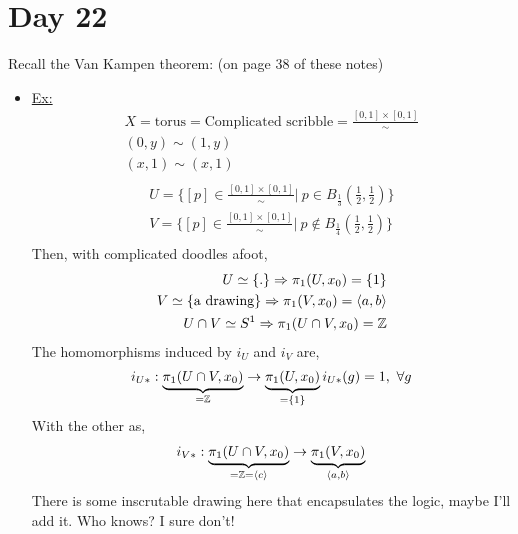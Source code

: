 \documentclass[../notes.tex]{subfiles}
\begin{document}
\section{Day 22}
Recall the Van Kampen theorem: (on page 38 of these notes)
\begin{itemize}
    \item \underline{Ex:}
        \begin{align*}
            X = \text{torus} = \text{Complicated scribble} =
            \frac{[0,1]\times [0,1]}{\sim}\\
            (0,y)\sim(1,y)\\
            (x,1)\sim(x,1)\\
        \end{align*}
        \begin{align*}
            U = \{[p]\in \frac{[0,1]\times [0,1]}{\sim}|\ p\in B_{\frac{1}{3}}(
                \frac{1}{2},\frac{1}{2})\}\\
            V = \{[p]\in \frac{[0,1]\times [0,1]}{\sim}|\ p\notin B_{\frac{1}{4}}(
                \frac{1}{2},\frac{1}{2})\}\\
        \end{align*}
        Then, with complicated doodles afoot,
        \begin{align*}
            U\simeq \{.\}\Rightarrow \pi_1(U,x_0)=\{1\}\\
            V\simeq \{\text{a drawing}\}\Rightarrow \pi_1(V,x_0)=\langle a,b \rangle\\
            U\cap V \simeq S^1\Rightarrow \pi_1(U\cap V, x_0)=\mathbb{Z}\\
        \end{align*}
        The homomorphisms induced by $i_U$ and $i_V$ are,
        \begin{align*}
            i_{U*}:\underbrace{\pi_1(U\cap V, x_0)}_{=\mathbb{Z}}\rightarrow
            \underbrace{\pi_1(U,x_0)}_{=\{1\}}
            i_{U*}(g)=1,\ \forall g\\
        \end{align*}
        With the other as,
        \begin{align*}
            i_{V*}:\underbrace{\pi_1(U\cap V, x_0)}_{=\mathbb{Z}=\langle c \rangle}
                \rightarrow \underbrace{\pi_1(V,x_0)}_{\langle a,b \rangle}\\
        \end{align*}
        There is some inscrutable drawing here that encapsulates the logic,
        maybe I'll add it. Who knows? I sure don't!
        \begin{align*}

\end{align*}
\end{itemize}
\end{document}
